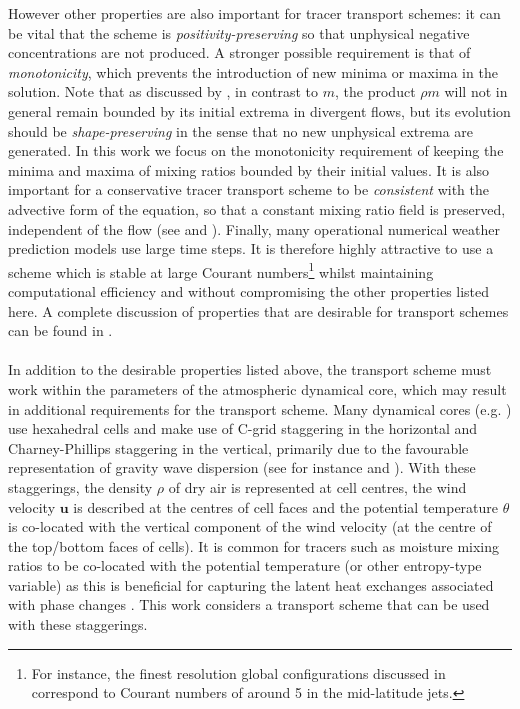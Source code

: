 \documentclass[11pt,a4paper]{article}
\begin{document}
However other properties are also important for tracer transport schemes: it can be vital that the scheme is \textit{positivity-preserving} so that unphysical negative concentrations are not produced.
A stronger possible requirement is that of \textit{monotonicity}, which prevents the introduction of new minima or maxima in the solution.
Note that as discussed by \citet{lauritzen2011numerical}, in contrast to $m$, the product $\rho m$ will not in general remain bounded by its initial extrema in divergent flows, but its evolution should be \textit{shape-preserving} in the sense that no new unphysical extrema are generated.
In this work we focus on the monotonicity requirement of keeping the minima and maxima of mixing ratios bounded by their initial values.
It is also important for a conservative tracer transport scheme to be \textit{consistent} with the advective form of the equation, so that a constant mixing ratio field is preserved, independent of the flow (see \citep{jockel2001fundamental} and \citep{zhang2008consistency}).
Finally, many operational numerical weather prediction models use large time steps.
It is therefore highly attractive to use a scheme which is stable at large Courant numbers\footnote{For instance, the finest resolution global configurations discussed in \citet{walters2019met} correspond to Courant numbers of around 5 in the mid-latitude jets.}
whilst maintaining computational efficiency and without compromising the other properties listed here.
A complete discussion of properties that are desirable for transport schemes can be found in \citet{lauritzen2011numerical}.
\\
\\
In addition to the desirable properties listed above, the transport scheme must work within the parameters of the atmospheric dynamical core, which may result in additional requirements for the transport scheme.
Many dynamical cores (e.g. \citep{chen2008new,wood2014inherently,girard2014staggered,melvin2024mixed}) use hexahedral cells and make use of C-grid staggering in the horizontal and Charney-Phillips staggering \citep{charney1953verticalstaggering} in the vertical, primarily due to the favourable representation of gravity wave dispersion (see for instance \citet{staniforth2012horizontal} and \citet{thuburn2022numerical}). 
With these staggerings, the density $\rho$ of dry air is represented at cell centres, the wind velocity $\bm{u}$ is described at the centres of cell faces and the potential temperature $\theta$ is co-located with the vertical component of the wind velocity (at the centre of the top/bottom faces of cells).
It is common for tracers such as moisture mixing ratios to be co-located with the potential temperature (or other entropy-type variable) as this is beneficial for capturing the latent heat exchanges associated with phase changes \citep{bendall2023solution}.
This work considers a transport scheme that can be used with these staggerings.
\end{document}
